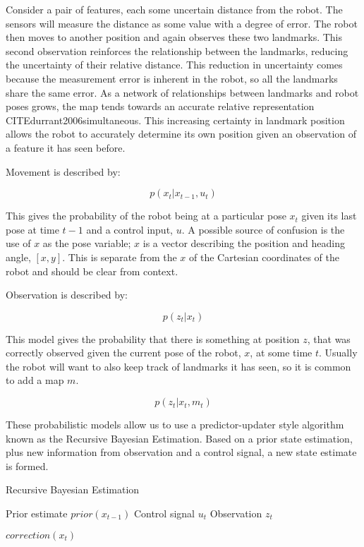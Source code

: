 \documentclass[12pt]{report}
\begin{document}
Consider a pair of features, each some uncertain distance from the robot.  The sensors will measure the distance as some value with a degree of error.  The robot then moves to another position and again observes these two landmarks.  This second observation reinforces the relationship between the landmarks, reducing the uncertainty of their relative distance.  This reduction in uncertainty comes because the measurement error is inherent in the robot, so all the landmarks share the same error.  As a network of relationships between landmarks and robot poses grows, the map tends towards an accurate relative representation CITE{durrant2006simultaneous}.  This increasing certainty in landmark position allows the robot to accurately determine its own position given an observation of a feature it has seen before.

Movement is described by:

\begin{equation}\label{predict_step}
p(x_{t}|x_{t-1},u_{t})
\end{equation}

This gives the probability of the robot being at a particular pose $x_{t}$ given its last pose at time $t-1$ and a control input, $u$.  A possible source of confusion is the use of $x$ as the pose variable;  $x$ is a vector describing the position and heading angle, $[x,y]$. This is separate from the $x$ of the Cartesian coordinates of the robot and should be clear from context.  

Observation is described by:

\begin{equation}\label{obs_stepA}
p(z_{t}|x_{t})
\end{equation}
   
This model gives the probability that there is something at position $z$, that was correctly observed given the current pose of the robot, $x$, at some time $t$.  Usually the robot will want to also keep track of landmarks it has seen, so it is common to add a map $m$.

\begin{equation}\label{obs_stepA}
p(z_{t}|x_{t}, m_t)
\end{equation}

These probabilistic models allow us to use a predictor-updater style algorithm known as the Recursive Bayesian Estimation.  Based on a prior state estimation, plus new information from observation and a control signal, a new state estimate is formed.

\begin{algorithm}     
\caption{Recursive Bayesian Estimation}  
\label{Bayes_Filter}   
\begin{algorithmic}         
    \Require Prior estimate $prior(x_{t-1})$ 
    \State Control signal $u_t$
    \State Observation $z_t$
    \EndFor

\State\Return $correction(x_t)$
\end{algorithmic}
\end{algorithm}
\end{document}
